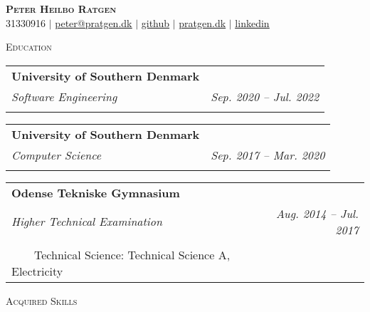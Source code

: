 \documentclass[11pt]{article}
\makeatletter
\newcommand{\tabitem}{~~\llap{\textbullet}~~}
\newcommand{\resumeSubheading}[5]{
  \noindent\begin{tabular*}{0.98\textwidth}[t]{l@{\extracolsep{\fill}}r}
    \textbf{#1} & #2 \\ \vspace{-3pt}
    \textit{\small#3} & \textit{\small #4} \\
    {\small #5}
  \end{tabular*}\vspace{7pt}
}
\makeatother
\begin{document}
\begin{center}
  \textbf{\huge{\scshape{Peter Heilbo Ratgen}}}\\ 
  \vspace{0.2cm}
  \small 31330916 $|$
  \href{mailto:peter@pratgen.dk}{\underline{peter@pratgen.dk}} $|$
  \href{https://github.com/PeterRatgen }{\underline{github}} $|$
  \href{https://pratgen.dk}{\underline{pratgen.dk}} $|$
  \href{https://www.linkedin.com/in/peter-ratgen-a1236529/}{\underline{linkedin}}
\end{center}

\noindent\large{\scshape{Education}} \newline
\noindent{\rule[0.3cm]{\textwidth}{0.4pt}}

\resumeSubheading{University of Southern Denmark}{}{Software Engineering}{Sep.
2020 -- Jul. 2022}{}

\resumeSubheading{University of Southern Denmark}{}{Computer Science}{Sep. 2017
-- Mar. 2020}{}

\resumeSubheading{Odense Tekniske Gymnasium}{}{Higher Technical
Examination}{Aug. 2014 -- Jul. 2017}{
    \tabitem{Specialized Study Area: Communication/IT A, Design B} \\
    \tabitem{Technical Science: Technical Science A, Electricity}
}

\vspace{0.5cm}

\noindent\large{\scshape{Acquired Skills}} \newline
\noindent{\rule[0.3cm]{\textwidth}{0.4pt}}
\end{document}
